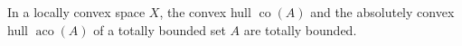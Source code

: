 In a locally convex space $X$, the convex hull $\operatorname{co}(A)$ and the absolutely convex hull $\operatorname{aco}(A)$ of a totally bounded set $A$ are totally bounded.